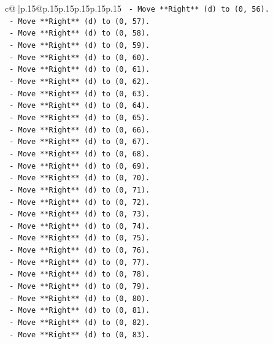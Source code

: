 \documentclass{article}
\begin{document}
{\begin{supertabular}{c@{$\;$}|p{.15\linewidth}@{}p{.15\linewidth}p{.15\linewidth}p{.15\linewidth}p{.15\linewidth}p{.15\linewidth}}
{{{\texttt{        {-} Move **Right** (d) to (0, 56).} \\
\texttt{        {-} Move **Right** (d) to (0, 57).} \\
\texttt{        {-} Move **Right** (d) to (0, 58).} \\
\texttt{        {-} Move **Right** (d) to (0, 59).} \\
\texttt{        {-} Move **Right** (d) to (0, 60).} \\
\texttt{        {-} Move **Right** (d) to (0, 61).} \\
\texttt{        {-} Move **Right** (d) to (0, 62).} \\
\texttt{        {-} Move **Right** (d) to (0, 63).} \\
\texttt{        {-} Move **Right** (d) to (0, 64).} \\
\texttt{        {-} Move **Right** (d) to (0, 65).} \\
\texttt{        {-} Move **Right** (d) to (0, 66).} \\
\texttt{        {-} Move **Right** (d) to (0, 67).} \\
\texttt{        {-} Move **Right** (d) to (0, 68).} \\
\texttt{        {-} Move **Right** (d) to (0, 69).} \\
\texttt{        {-} Move **Right** (d) to (0, 70).} \\
\texttt{        {-} Move **Right** (d) to (0, 71).} \\
\texttt{        {-} Move **Right** (d) to (0, 72).} \\
\texttt{        {-} Move **Right** (d) to (0, 73).} \\
\texttt{        {-} Move **Right** (d) to (0, 74).} \\
\texttt{        {-} Move **Right** (d) to (0, 75).} \\
\texttt{        {-} Move **Right** (d) to (0, 76).} \\
\texttt{        {-} Move **Right** (d) to (0, 77).} \\
\texttt{        {-} Move **Right** (d) to (0, 78).} \\
\texttt{        {-} Move **Right** (d) to (0, 79).} \\
\texttt{        {-} Move **Right** (d) to (0, 80).} \\
\texttt{        {-} Move **Right** (d) to (0, 81).} \\
\texttt{        {-} Move **Right** (d) to (0, 82).} \\
\texttt{        {-} Move **Right** (d) to (0, 83).} \\
}}}
\end{supertabular}}
\end{document}
